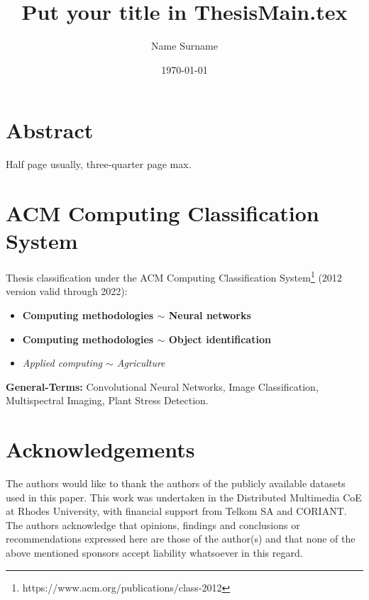\documentclass[12pt] {ThesisRU}    %
\begin{document}
	
\title{Put your title in ThesisMain.tex}
\author{Name Surname}
\date {\today}
\maketitle  



\chapter*{Abstract}
Half page usually, three-quarter page max.

\newpage


\chapter*{ACM Computing Classification System}  


Thesis classification under the ACM Computing Classification System\footnote{https://www.acm.org/publications/class-2012} (2012 version valid through 2022):
\begin{itemize}
\item \textbf{Computing methodologies $\mathtt{\sim}$ Neural networks}
\item \textbf{Computing methodologies $\mathtt{\sim}$ Object identification}
\item \textit{Applied computing $\mathtt{\sim}$ Agriculture}
\end{itemize}


\textbf{General-Terms:} Convolutional Neural Networks, Image Classification, Multispectral Imaging, Plant Stress Detection.


\newpage

\chapter*{Acknowledgements}
The authors would like to thank the authors of the publicly available datasets used in this paper. This work was undertaken in the Distributed Multimedia CoE at Rhodes University, with financial support from Telkom SA and CORIANT. The authors acknowledge that opinions, findings and conclusions or recommendations expressed here are those of the author(s) and that none of the above mentioned sponsors accept liability whatsoever in this regard.
\end{document}
